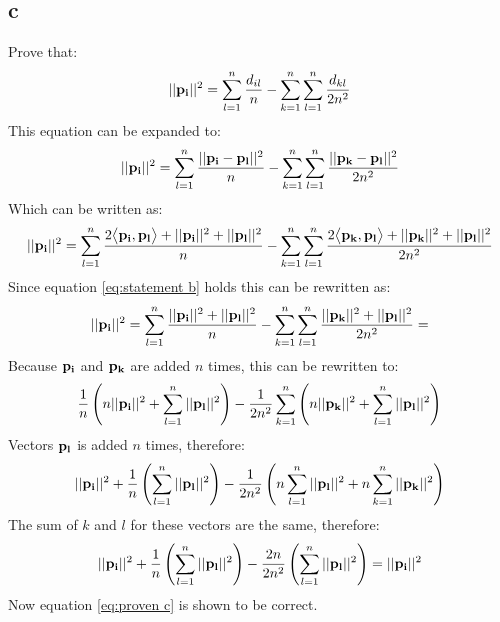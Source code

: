 \documentclass[a4paper,12pt]{article}
\begin{document}
\subsection{c}
Prove that:
\begin{equation}
\begin{aligned}
||{\bf p_i}||^2=\sum_{l=1}^n \frac{d_{il}}{n}-\sum^{n}_{k=1}\sum_{l=1}^n\frac{d_{kl}}{2n^2}
\end{aligned}
\label{eq:proven c}
\end{equation}
This equation can be expanded to:
\begin{equation}
\begin{aligned}
||{\bf p_i}||^2=\sum_{l=1}^n \frac{||{\bf p_i-p_l}||^2}{n}-\sum^{n}_{k=1}\sum_{l=1}^n\frac{||{\bf p_k-p_l}||^2}{2n^2}
\end{aligned}
\end{equation}
Which can be written as:
\begin{equation}
\begin{aligned}
||{\bf p_i}||^2=\sum_{l=1}^n \frac{2\big \langle{\bf p_i,p_l}\big \rangle+||{\bf p_i}||^2+||{\bf p_l}||^2}{n}-\sum^{n}_{k=1}\sum_{l=1}^n\frac{2\big \langle{\bf p_k,p_l}\big \rangle+||{\bf p_k}||^2+||{\bf p_l}||^2}{2n^2}
\end{aligned}
\end{equation}
Since equation \ref{eq:statement b} holds this can be rewritten as:
\begin{equation}
\begin{aligned}
||{\bf p_i}||^2=
\sum_{l=1}^n \frac{||{\bf p_i}||^2+||{\bf p_l}||^2}{n}-\sum^{n}_{k=1}\sum_{l=1}^n\frac{||{\bf p_k}||^2+||{\bf p_l}||^2}{2n^2}=
\end{aligned}
\end{equation}
Because ${\bf p_i}$ and ${\bf p_k}$ are added $n$ times, this can be rewritten to:
\begin{equation}
\begin{aligned}
\frac{1}{n}\left(n ||{\bf p_i}||^2 + \sum_{l=1}^n ||{\bf p_l}||^2 \right)-\frac{1}{2n^2} \sum_{k=1}^n \left(n ||{\bf p_k}||^2  + \sum^{n}_{l=1} ||{\bf p_l}||^2 \right)
\end{aligned}
\end{equation}
Vectors ${\bf p_l}$ is added $n$ times, therefore:
\begin{equation}
\begin{aligned}
||{\bf p_i}||^2+\frac{1}{n}\left(\sum_{l=1}^n ||{\bf p_l}||^2 \right)-\frac{1}{2n^2}\left( n \sum_{l=1}^n ||{\bf p_l}||^2+n \sum_{k=1}^n ||{\bf p_k}||^2 \right)
\end{aligned}
\end{equation}
The sum of $k$ and $l$ for these vectors are the same, therefore:
\begin{equation}
\begin{aligned}
||{\bf p_i}||^2+\frac{1}{n}\left(\sum_{l=1}^n ||{\bf p_l}||^2 \right)-\frac{2n}{2n^2}\left(  \sum_{l=1}^n ||{\bf p_l}||^2 \right)=||{\bf p_i}||^2
\end{aligned}
\end{equation}
Now equation \ref{eq:proven c} is shown to be correct. 
\end{document}
